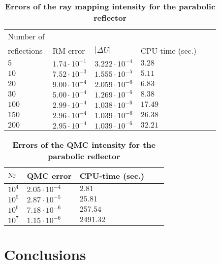 \begin{table}[t] 
\centering
\caption{\bf Errors of the ray mapping intensity for the parabolic reflector}
\begin{tabular}{llllll}
 \hline  Number of\\
 reflections\;  & RM error & $|\Delta U|$ & CPU-time (sec.)\\
  \hline 
 $5$      & $1.74\cdot 10^{-1}$  & $3.222\cdot10^{-4}$& $3.28$  \\
$10$      & $7.52\cdot 10^{-3}$ & $1.555\cdot 10^{-5}$& $5.11$   \\
$20$      & $9.00 \cdot 10^{-4}$ & $2.059\cdot 10^{-6}$& $6.83$  \\
 $30$    & $5.00 \cdot 10^{-4}$ & $1.269\cdot 10^{-6}$ & $8.38$  \\
$100$    & $2.99 \cdot 10^{-4}$ & $1.038\cdot 10^{-6}$ & $17.49$  \\
$150$    & $2.96 \cdot 10^{-4}$ & $1.039\cdot 10^{-6}$ & $26.38$  \\
$200$    & $2.95 \cdot 10^{-4}$ & $1.039\cdot 10^{-6}$ & $32.21$  \\
 \hline
 \end{tabular}
 \label{tab:ray_mapping_pr}
 \end{table}

\begin{table}[t] 
\centering
\caption{\bf Errors of the QMC intensity for the parabolic reflector}
\begin{tabular}{lllll}
 \hline  $\textrm{Nr}$\;  & QMC error & CPU-time (sec.)\\
  \hline 
 $10^4$     & $2.05\cdot 10^{-4}$   & $2.81$  \\
$10^5$      & $2.87\cdot 10^{-5}$   & $25.81$   \\
$10^6$      & $7.18 \cdot 10^{-6}$  & $257.54$  \\
 $10^7$     & $1.15 \cdot 10^{-6}$  & $2491.32$  \\
 \hline
 \end{tabular}
 \label{tab:qmc_raymapping_pr}
 \end{table}
\section{Conclusions}
